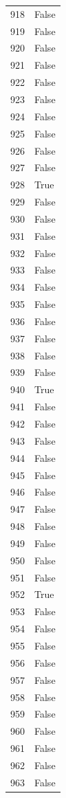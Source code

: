 \documentclass[
  letterpaper,
  DIV=11,
  numbers=noendperiod]{scrreprt}
\begin{document}
\begin{tabular}{ll}
918  &  False \\
919  &  False \\
920  &  False \\
921  &  False \\
922  &  False \\
923  &  False \\
924  &  False \\
925  &  False \\
926  &  False \\
927  &  False \\
928  &   True \\
929  &  False \\
930  &  False \\
931  &  False \\
932  &  False \\
933  &  False \\
934  &  False \\
935  &  False \\
936  &  False \\
937  &  False \\
938  &  False \\
939  &  False \\
940  &   True \\
941  &  False \\
942  &  False \\
943  &  False \\
944  &  False \\
945  &  False \\
946  &  False \\
947  &  False \\
948  &  False \\
949  &  False \\
950  &  False \\
951  &  False \\
952  &   True \\
953  &  False \\
954  &  False \\
955  &  False \\
956  &  False \\
957  &  False \\
958  &  False \\
959  &  False \\
960  &  False \\
961  &  False \\
962  &  False \\
963  &  False \\

\end{tabular}
\end{document}
